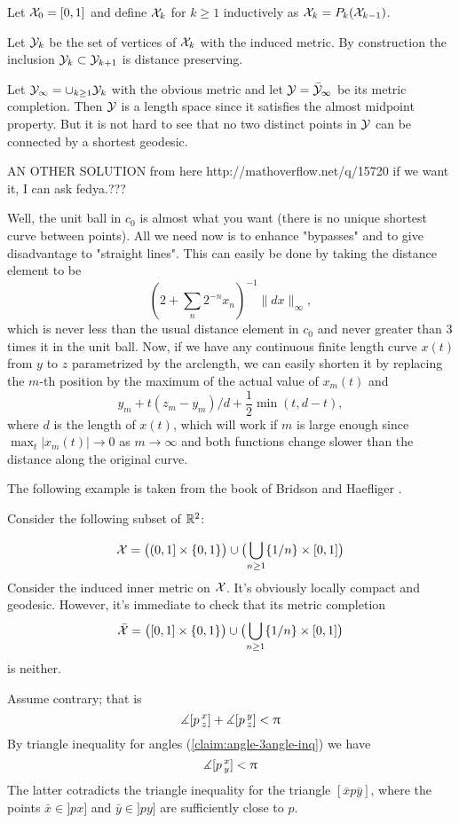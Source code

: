 Let $\mathcal{X}_0=[0,1]$ and define $\mathcal{X}_k$ for $k\ge 1$ inductively as $\mathcal{X}_k=P_k(\mathcal{X}_{k-1})$.

Let $\mathcal{Y}_k$ be the set of vertices of $\mathcal{X}_k$ with the induced metric. By construction the inclusion $\spc{Y}_k\subset \spc{Y}_{k+1}$ is distance preserving.

Let $\spc{Y}_\infty=\cup_{k\ge 1}\spc{Y}_k$ with the obvious metric and let $\mathcal{Y}=\bar {\mathcal{Y}}_\infty$ be its metric completion. Then $\mathcal{Y}$ is a length space since it satisfies the almost midpoint property. But it is not hard to see that no two distinct points in $\mathcal{Y}$ can be connected by a shortest geodesic. \qeds

AN OTHER SOLUTION from here http://mathoverflow.net/q/15720
if we want it, I can ask fedya.???

Well, the unit ball in $c_0$ is almost what you want (there is no unique shortest curve between points). 
All we need now is to enhance "bypasses" and to give disadvantage to "straight lines". 
This can easily be done by taking the distance element to be \[(2+\sum_n 2^{-n}x_n)^{-1}\|dx\|_\infty,\] 
which is never less than the usual distance element in $c_0$ and never greater than 3 times it in the unit ball. Now, if we have any continuous finite length curve $x(t)$ from $y$ to $z$ parametrized by the arclength, we can easily shorten it by replacing the $m$-th position by the maximum of the actual value of $x_m(t)$ and 
\[y_m+t(z_m-y_m)/d+\frac 12 \min(t,d-t),\] 
where $d$ is the length of $x(t)$, which will work if $m$ is large enough since $\max_t|x_m(t)|\to 0$ as $m\to\infty$ and both functions change slower than the distance along the original curve.

The following example is taken from the book of Bridson and Haefliger \cite{BH}.

Consider the following subset of $\mathbb{R}^2$:

\[
\spc{X}
=
\bigl((0,1]\times\{0,1\}\bigr)
\cup
\bigl(\bigcup_{n\ge 1}\{1/n\}\times[0,1]\bigr)
\]
Consider the induced inner metric on $\mathcal{X}$. It's obviously locally compact and geodesic.
However, it's immediate to check that its metric completion \[\bar{\spc{X}}
=
\bigl([0,1]\times\{0,1\}\bigr)
\cup
\bigl(\bigcup_{n\ge 1}\{1/n\}\times[0,1]\bigr)\] 
is neither. \qeds 

Assume contrary; that is
\[\measuredangle[p\,{}^{x}_{z}]+\measuredangle[p\,{}^{y}_{z}]< \uppi\]
By triangle inequality for angles (\ref{claim:angle-3angle-inq})
we have 
\[\measuredangle[p\,{}^{x}_{y}]<\uppi\]
The latter cotradicts the triangle inequality for the triangle $[\bar x p \bar y]$,
where the points
$\bar x\in ]px]$ and $\bar y\in ]py]$
are sufficiently close to $p$.

